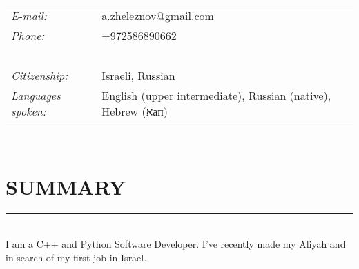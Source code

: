 \documentclass[a4paper,oneside,12pt]{article}
\newcommand{\cvpart}[1]{%
\vspace{-1em}%
\section*{\Large\bfseries\MakeTextUppercase{#1}}%
\vspace{-1em}%
\rule{\linewidth}{0.3em}\\[-.3em]%
}
\begin{document}
\begin{centering}
\begin{minipage}{0.70\linewidth}%
\vspace{-3em}{\Huge\bfseries Alexander Zheleznov}

~\\[-.5em]

\hspace{1.9em}\begin{tabularx}{\linewidth}{ll}
{\it E-mail:}		& a.zheleznov@gmail.com\\
{\it Phone:}	        & {\small +972586890662} \\

~\\[-1.0em]
    {\it Citizenship:} & Israeli, Russian \\
    {\it Languages spoken:}& English (upper intermediate), Russian (native), Hebrew (אап)\\
\end{tabularx}
\end{minipage}
\end{centering}
~\\[1.5em]


\cvpart{Summary}

I am a C++ and Python Software Developer.
I've recently made my Aliyah and in search of my first job in Israel.

~\\
\end{document}
